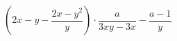 \begin{ex}[type=expression]
	\begin{condition}
		\(\left( 2x-y-\dfrac{2x-y^2}{y} \right)\cdot\dfrac{a}{3xy-3x}-\dfrac{a-1}{y}\)
	\end{condition}
\end{ex}